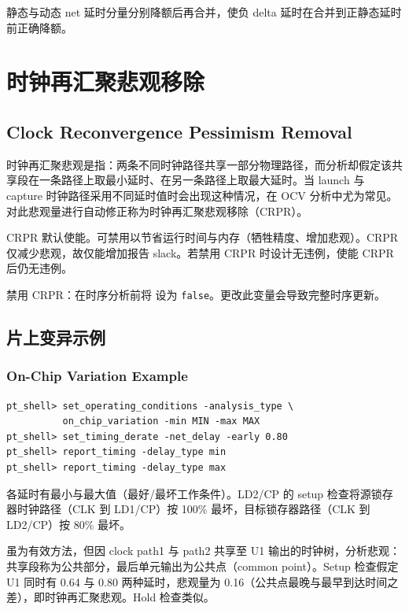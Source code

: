 静态与动态 net 延时分量分别降额后再合并，使负 delta 延时在合并到正静态延时前正确降额。

\section{时钟再汇聚悲观移除}
\subsection*{Clock Reconvergence Pessimism Removal}

时钟再汇聚悲观是指：两条不同时钟路径共享一部分物理路径，而分析却假定该共享段在一条路径上取最小延时、在另一条路径上取最大延时。当 launch 与 capture 时钟路径采用不同延时值时会出现这种情况，在 OCV 分析中尤为常见。对此悲观量进行自动修正称为时钟再汇聚悲观移除（CRPR）。

CRPR 默认使能。可禁用以节省运行时间与内存（牺牲精度、增加悲观）。CRPR 仅减少悲观，故仅能增加报告 slack。若禁用 CRPR 时设计无违例，使能 CRPR 后仍无违例。

禁用 CRPR：在时序分析前将  设为 \texttt{false}。更改此变量会导致完整时序更新。

\subsection{片上变异示例}
\subsubsection*{On-Chip Variation Example}

\begin{lstlisting}
pt_shell> set_operating_conditions -analysis_type \
          on_chip_variation -min MIN -max MAX
pt_shell> set_timing_derate -net_delay -early 0.80
pt_shell> report_timing -delay_type min
pt_shell> report_timing -delay_type max
\end{lstlisting}


各延时有最小与最大值（最好/最坏工作条件）。LD2/CP 的 setup 检查将源锁存器时钟路径（CLK 到 LD1/CP）按 100\% 最坏，目标锁存器路径（CLK 到 LD2/CP）按 80\% 最坏。

虽为有效方法，但因 clock path1 与 path2 共享至 U1 输出的时钟树，分析悲观：共享段称为公共部分，最后单元输出为公共点（common point）。Setup 检查假定 U1 同时有 0.64 与 0.80 两种延时，悲观量为 0.16（公共点最晚与最早到达时间之差），即时钟再汇聚悲观。Hold 检查类似。

